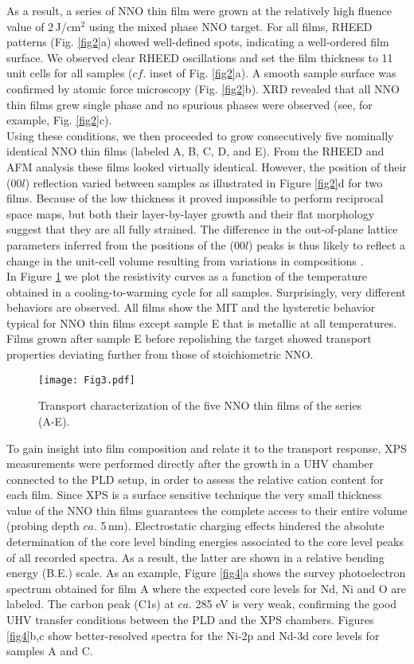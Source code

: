 \documentclass[aip,graphicx,numerical]{revtex4-1}
\begin{document}
As a result, a series of NNO thin film were grown at the relatively high fluence value of 2\,J/cm$^2$ using the mixed phase NNO target. For all films, RHEED patterns (Fig. \ref{fig2}a) showed well-defined spots, indicating a well-ordered film surface. We observed clear RHEED oscillations and set the film thickness to 11 unit cells for all samples ($cf.$ inset of Fig. \ref{fig2}a). A smooth sample surface was confirmed by atomic force microscopy (Fig. \ref{fig2}b). XRD revealed that all NNO thin films grew single phase and no spurious phases were observed (see, for example, Fig. \ref{fig2}c). \\
Using these conditions, we then proceeded to grow consecutively five nominally identical NNO thin films (labeled A, B, C, D, and E). From the RHEED and AFM analysis these films looked virtually identical. However, the position of their (00$l$) reflection varied between samples as illustrated in Figure \ref{fig2}d for two films. Because of the low thickness it proved impossible to perform reciprocal space maps, but both their layer-by-layer growth and their flat morphology suggest that they are all fully strained. The difference in the out-of-plane lattice parameters inferred from the positions of the (00$l$) peaks is thus likely to reflect a change in the unit-cell volume resulting from variations in compositions \cite{Breckenfeld_2014} . \\
In Figure \ref{fig3} we plot the resistivity curves as a function of the temperature obtained in a cooling-to-warming cycle for all samples. Surprisingly, very different behaviors are observed. All films show the MIT and the hysteretic behavior typical for NNO thin films \cite{Blasco_1994} except sample E that is metallic at all temperatures. Films grown after sample E before repolishing the target showed transport properties deviating further from those of stoichiometric NNO.
\begin{figure}
  \texttt{[image: Fig3.pdf]}
  \caption{Transport characterization of the five NNO thin films of the series (A-E).}
  \label{fig3}
\end{figure}
To gain insight into film composition and relate it to the transport response, XPS measurements were performed directly after the growth in a UHV chamber connected to the PLD setup, in order to assess the relative cation content for each film. Since XPS is a surface sensitive technique the very small thickness value of the NNO thin films guarantees the complete access to their entire volume (probing depth $ca.$ 5\,nm). Electrostatic charging effects hindered the absolute determination of the core level binding energies associated to the core level peaks of all recorded spectra. As a result, the latter are shown in a relative bending energy (B.E.) scale. As an example, Figure \ref{fig4}a shows the survey photoelectron spectrum obtained for film A where the expected core levels for Nd, Ni and O are labeled. The carbon peak (C1s) at $ca.$ 285 eV is very weak, confirming the good UHV transfer conditions between the PLD and the XPS chambers. Figures \ref{fig4}b,c show better-resolved spectra for the Ni-2p and Nd-3d core levels for samples A and C. 
\end{document}
